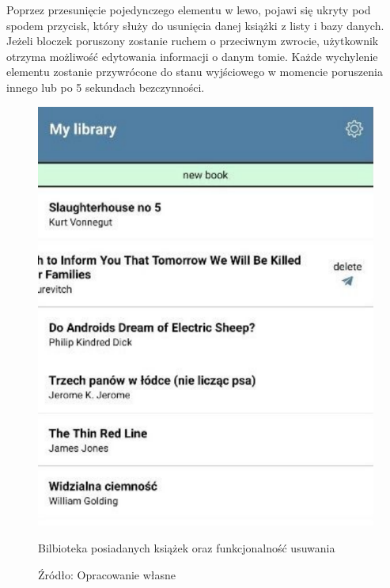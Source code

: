 Poprzez przesunięcie pojedynczego elementu w lewo, pojawi się ukryty pod spodem przycisk, który służy do usunięcia danej książki z listy i bazy danych. Jeżeli bloczek poruszony zostanie ruchem o przeciwnym zwrocie, użytkownik otrzyma możliwość edytowania informacji o danym tomie.
Każde wychylenie elementu zostanie przywrócone do stanu wyjściowego w momencie poruszenia innego lub po 5 sekundach bezczynności.
\begin{figure}[H]
	\centering
	\includegraphics{mylib.pdf}
	\caption{Bilbioteka posiadanych książek oraz funkcjonalność usuwania}
	\caption*{Źródło: {Opracowanie własne}}
\end{figure}


